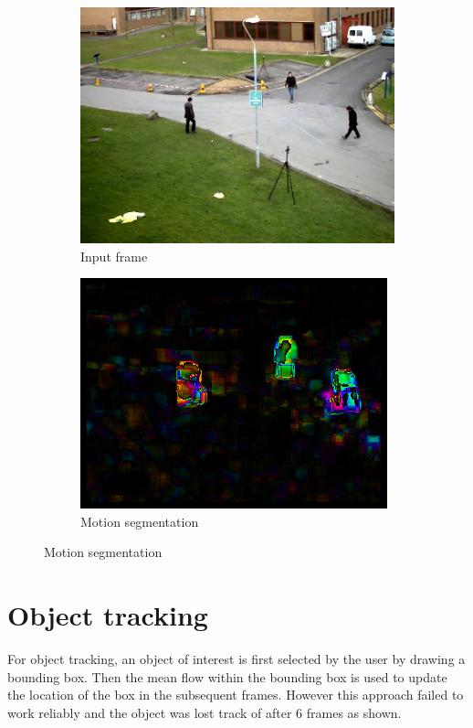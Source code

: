 \documentclass[a4paper,11]{article}
\begin{document}
\begin{figure}[H]
  \begin{subfigure}{0.5\textwidth}
    \centering
    \includegraphics[width=0.8\linewidth]{frame}
    \caption{Input frame}
  \end{subfigure}
  \begin{subfigure}{0.5\textwidth}
    \centering
    \includegraphics[width=0.8\linewidth]{motion_seg}
    \caption{Motion segmentation}
  \end{subfigure}
\end{figure}


\section{Object tracking}

For object tracking, an object of interest is first selected by the user by drawing a bounding box. Then the mean flow within the bounding box is used to update the location of the box in the subsequent frames. However this approach failed to work reliably and the object was lost track of after 6 frames as shown.
\end{document}

